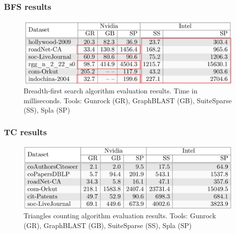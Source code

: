 \documentclass[aspectratio=169,xcolor=table,english]{beamer}
\begin{document}
\begin{frame}[fragile] \frametitle{BFS results}
    \begin{center}
    \begin{minipage}[m]{0.9\linewidth}
        \begin{figure}
            \centering
            \includegraphics[width=1.0\textwidth]{figures/exp_bfs_res_bad.png}
            \caption{Breadth-first search algorithm evaluation results. Time in milliseconds. Tools: Gunrock (GR), GraphBLAST (GB), SuiteSparse (SS), Spla (SP)}
        \end{figure}
    \end{minipage}\hfill   
    \end{center}
\end{frame}

\begin{frame}[fragile] \frametitle{TC results}
    \begin{center}
    \begin{minipage}[m]{0.9\linewidth}
        \begin{figure}
            \centering
            \includegraphics[width=1.0\textwidth]{figures/exp_tc_res.png}
            \caption{Triangles counting algorithm evaluation results. Tools: Gunrock (GR), GraphBLAST (GB), SuiteSparse (SS), Spla (SP)}
        \end{figure}
    \end{minipage}\hfill   
    \end{center}
\end{frame}
\end{document}
